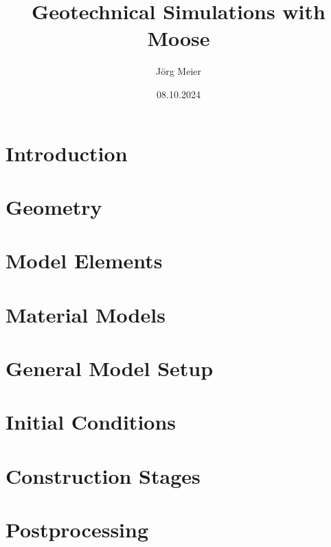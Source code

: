 \documentclass[12pt,a4paper]{report}
\title{Geotechnical Simulations with Moose}
\author{Jörg Meier}
\date{08.10.2024}
\begin{document}


\tableofcontents

\chapter{Introduction}
\label{chap:introduction}


\chapter{Geometry}
\label{chap:geometry}


\chapter{Model Elements}
\label{chap:elements}


\chapter{Material Models}
\label{chap:materials}


\chapter{General Model Setup}
\label{chap:setup}


\chapter{Initial Conditions}
\label{chap:initial}


\chapter{Construction Stages}
\label{chap:stages}


\chapter{Postprocessing}
\label{chap:postprocessing}


% 
\end{document}
